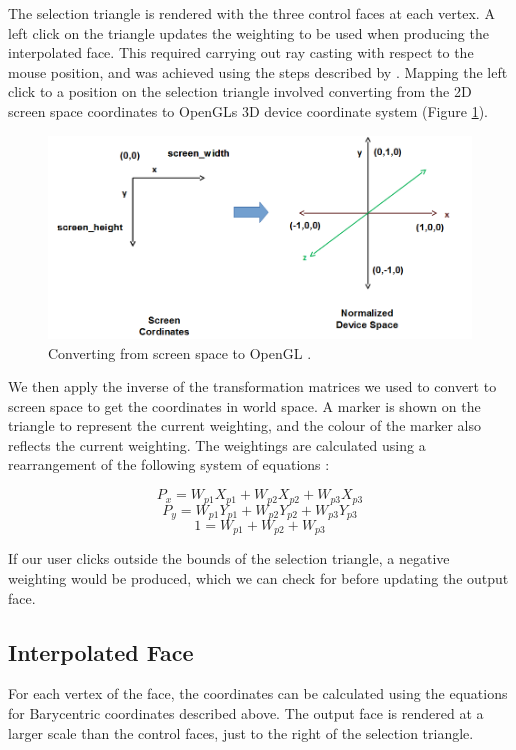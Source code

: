 \documentclass[12pt]{article}
\begin{document}
The selection triangle is rendered with the three control faces at each vertex.
A left click on the triangle updates the weighting to be used when producing the interpolated face.
This required carrying out ray casting with respect to the mouse position, and was achieved using the steps described by \cite{screenspace}.
Mapping the left click to a position on the selection triangle involved converting from the 2D screen space coordinates to OpenGLs 3D device coordinate system (Figure \ref{fig:screen_coordinates}).

\begin{figure}[!ht]
	\centering
	\includegraphics[width=\linewidth]{images/screen_coordinates.png}
    \caption{Converting from screen space to OpenGL \cite{lwjglgamedev}.}
	\label{fig:screen_coordinates}
\end{figure}

We then apply the inverse of the transformation matrices we used to convert to screen space to get the coordinates in world space.
A marker is shown on the triangle to represent the current weighting, and the colour of the marker also reflects the current weighting.
The weightings are calculated using a rearrangement of the following system of equations \cite{barycentric}:

$$
P_x = W_{p1}X_{p1} + W_{p2}X_{p2} + W_{p3}X_{p3} 
$$
$$
P_y = W_{p1}Y_{p1} + W_{p2}Y_{p2} + W_{p3}Y_{p3}
$$
$$
1 = W_{p1} + W_{p2} + W_{p3}
$$

If our user clicks outside the bounds of the selection triangle, a negative weighting would be produced, which we can check for before updating the output face.

\subsection{Interpolated Face}

For each vertex of the face, the coordinates can be calculated using the equations for Barycentric coordinates described above.
The output face is rendered at a larger scale than the control faces, just to the right of the selection triangle.
\end{document}
